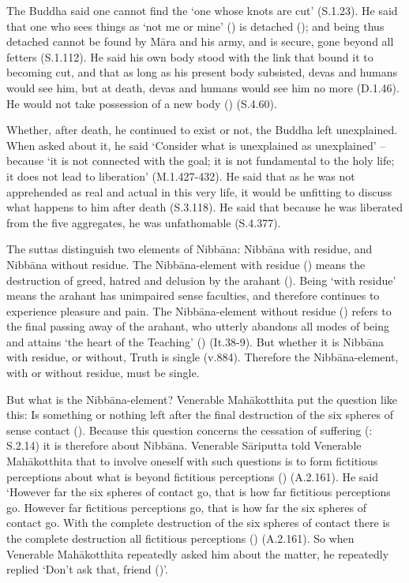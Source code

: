 
The Buddha said one cannot find the `one whose knots are cut' (S.1.23). He said that one who sees things as `not me or mine' () is detached (); and being thus detached cannot be found by Māra and his army, and is secure, gone beyond all fetters (S.1.112). He said his own body stood with the link that bound it to becoming cut, and that as long as his present body subsisted, devas and humans would see him, but at death, devas and humans would see him no more (D.1.46). He would not take possession of a new body () (S.4.60).

Whether, after death, he continued to exist or not, the Buddha left unexplained. When asked about it, he said `Consider what is unexplained as unexplained' -- because `it is not connected with the goal; it is not fundamental to the holy life; it does not lead to liberation' (M.1.427-432). He said that as he was not apprehended as real and actual in this very life, it would be unfitting to discuss what happens to him after death (S.3.118). He said that because he was liberated from the five aggregates, he was unfathomable (S.4.377).

The suttas distinguish two elements of Nibbāna: Nibbāna with residue, and Nibbāna without residue. The Nibbāna-element with residue () means the destruction of greed, hatred and delusion by the arahant (). Being `with residue' means the arahant has unimpaired sense faculties, and therefore continues to experience pleasure and pain. The Nibbāna-element without residue () refers to the final passing away of the arahant, who utterly abandons all modes of being and attains `the heart of the Teaching' () (It.38-9). But whether it is Nibbāna with residue, or without, Truth is single (v.884). Therefore the Nibbāna-element, with or without residue, must be single.

But what is the Nibbāna-element? Venerable Mahākotthita put the question like this: Is something or nothing left after the final destruction of the six spheres of sense contact (). Because this question concerns the cessation of suffering (: S.2.14) it is therefore about Nibbāna. Venerable Sāriputta told Venerable Mahākotthita that to involve oneself with such questions is to form fictitious perceptions about what is beyond fictitious perceptions () (A.2.161). He said `However far the six spheres of contact go, that is how far fictitious perceptions go. However far fictitious perceptions go, that is how far the six spheres of contact go. With the complete destruction of the six spheres of contact there is the complete destruction all fictitious perceptions () (A.2.161). So when Venerable Mahākotthita repeatedly asked him about the matter, he repeatedly replied `Don't ask that, friend ()'.

